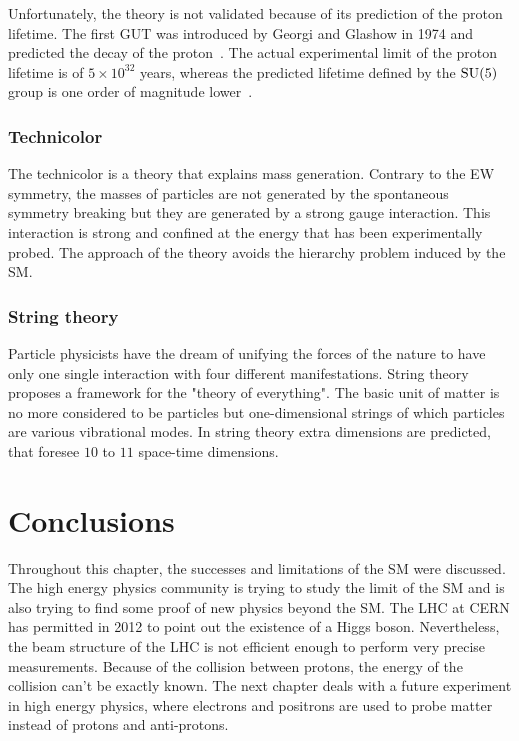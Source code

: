       Unfortunately, the theory is not validated because of its prediction of the proton lifetime. 
      The first \gls{GUT} was introduced by Georgi and Glashow in 1974 and predicted the decay of the proton~\cite{Georgi:1974sy}. 
      The actual experimental limit of the proton lifetime is of $5 \times 10^{32}$ years, whereas the predicted lifetime defined by the $\rm{SU}(5)$ group is one order of magnitude lower~\cite{Agashe:2014kda}.

      \subsubsection{Technicolor}

      The technicolor is a theory that explains mass generation.
      Contrary to the \gls{EW} symmetry, the masses of particles are not generated by the spontaneous symmetry breaking but they are generated by a strong gauge interaction.
      This interaction is strong and confined at the energy that has been experimentally probed.
      The approach of the theory avoids the hierarchy problem induced by the \gls{SM}.
      
      \subsubsection{String theory}

      Particle physicists have the dream of unifying the forces of the nature to have only one single interaction with four different manifestations.
      String theory proposes a framework for the "theory of everything".
      The basic unit of matter is no more considered to be particles but one-dimensional strings of which particles are various vibrational modes.
      In string theory extra dimensions are predicted, that foresee $10$ to $11$ space-time dimensions.

  \section{Conclusions}

  Throughout this chapter, the successes and limitations of the \gls{SM} were discussed.
  The high energy physics community is trying to study the limit of the \gls{SM} and is also trying to find some proof of new physics beyond the \gls{SM}.
  The \gls{LHC} at CERN has permitted in 2012 to point out the existence of a Higgs boson.  
  Nevertheless, the beam structure of the \gls{LHC} is not efficient enough to perform very precise measurements.
  Because of the collision between protons, the energy of the collision can't be exactly known.
  The next chapter deals with a future experiment in high energy physics, where electrons and positrons are used to probe matter instead of protons and anti-protons.

